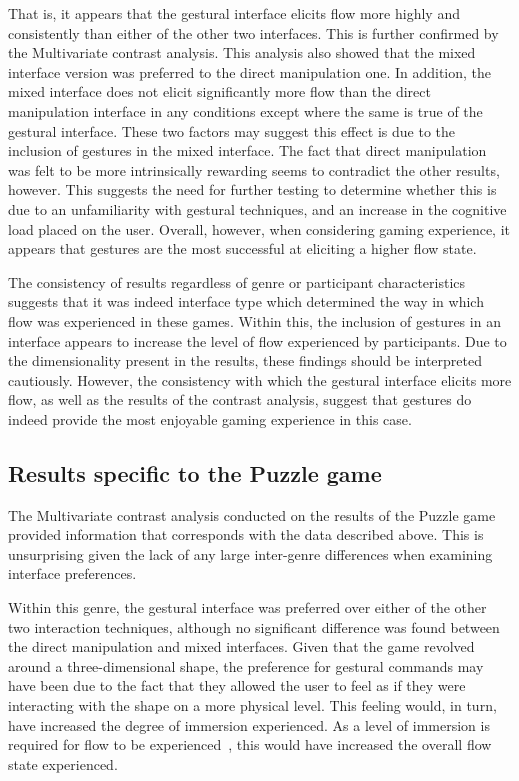That is, it appears that the gestural interface elicits flow more highly and consistently than either of the other two interfaces. This is further confirmed by the Multivariate contrast analysis. This analysis also showed that the mixed interface version was preferred to the direct manipulation one. In addition, the mixed interface does not elicit significantly more flow than the direct manipulation interface in any conditions except where the same is true of the gestural interface. These two factors may suggest this effect is due to the inclusion of gestures in the mixed interface. The fact that direct manipulation was felt to be more intrinsically rewarding seems to contradict the other results, however. This suggests the need for further testing to determine whether this is due to an unfamiliarity with gestural techniques, and an increase in the cognitive load placed on the user. Overall, however, when considering gaming experience, it appears that gestures are the most successful at eliciting a higher flow state.

The consistency of results regardless of genre or participant characteristics suggests that it was indeed interface type which determined the way in which flow was experienced in these games. Within this, the inclusion of gestures in an interface appears to increase the level of flow experienced by participants. Due to the dimensionality present in the results, these findings should be interpreted cautiously. However, the consistency with which the gestural interface elicits more flow, as well as the results of the contrast analysis, suggest that gestures do indeed provide the most enjoyable gaming experience in this case.

\subsection{Results specific to the Puzzle game}
The Multivariate contrast analysis conducted on the results of the Puzzle game provided information that corresponds with the data described above. This is unsurprising given the lack of any large inter-genre differences when examining interface preferences.

Within this genre, the gestural interface was preferred over either of the other two interaction techniques, although no significant difference was found between the direct manipulation and mixed interfaces. Given that the game revolved around a three-dimensional shape, the preference for gestural commands may have been due to the fact that they allowed the user to feel as if they were interacting with the shape on a more physical level. This feeling would, in turn, have increased the degree of immersion experienced. As a level of immersion is required for flow to be experienced~\citep{Swee05}, this would have increased the overall flow state experienced. 

